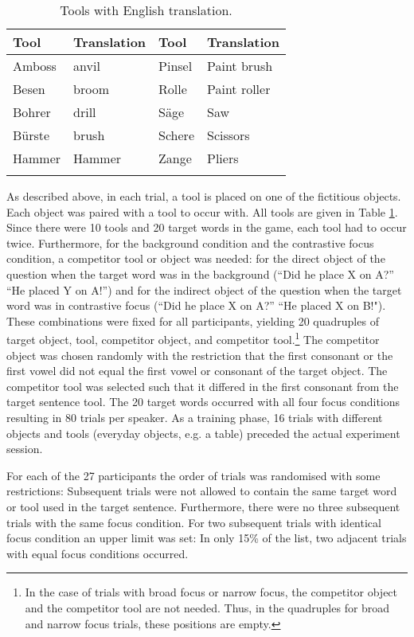 \begin{table}[t]
	\caption{Tools with English translation.}
	\begin{tabularx}{\textwidth}{XlXl}
		\lsptoprule
		Tool & Translation & Tool & Translation \\
		\midrule
		Amboss & anvil & Pinsel & Paint brush \\
		Besen & broom & Rolle & Paint roller \\ 
		Bohrer & drill & Säge & Saw \\
		Bürste & brush & Schere & Scissors \\
		Hammer & Hammer & Zange & Pliers\\
		\lspbottomrule
	\end{tabularx}
	\label{tab:tools}
\end{table}

As described above, in each trial, a tool is placed on one of the fictitious objects. Each object was paired with a tool to occur with. All tools are given in Table \ref{tab:tools}. Since there were 10 tools and 20 target words in the game, each tool had to occur twice. Furthermore, for the background condition and the contrastive focus condition, a competitor tool or object was needed: for the direct object of the question when the target word was in the background (``Did he place X on A?” “He placed Y on A!”) and for the indirect object of the question when the target word was in contrastive focus (``Did he place X on A?” “He placed X on B!"). These combinations were fixed for all participants, yielding 20 quadruples of target object, tool, competitor object, and competitor tool.\footnote{In the case of trials with broad focus or narrow focus, the competitor object and the competitor tool are not needed. Thus, in the quadruples for broad and narrow focus trials, these positions are empty.} The competitor object was chosen randomly with the restriction that the first consonant or the first vowel did not equal the first vowel or consonant of the target object. The competitor tool was selected such that it differed in the first consonant from the target sentence tool. The 20 target words occurred with all four focus conditions resulting in 80 trials per speaker. As a training phase, 16 trials with different objects and tools (everyday objects, e.g. a table) preceded the actual experiment session. 



For each of the 27 participants the order of trials was randomised with some restrictions: Subsequent trials were not allowed to contain the same target word or tool used in the target sentence. Furthermore, there were no three subsequent trials with the same focus condition. For two subsequent trials with identical focus condition an upper limit was set: In only 15\% of the list, two adjacent trials with equal focus conditions occurred.

